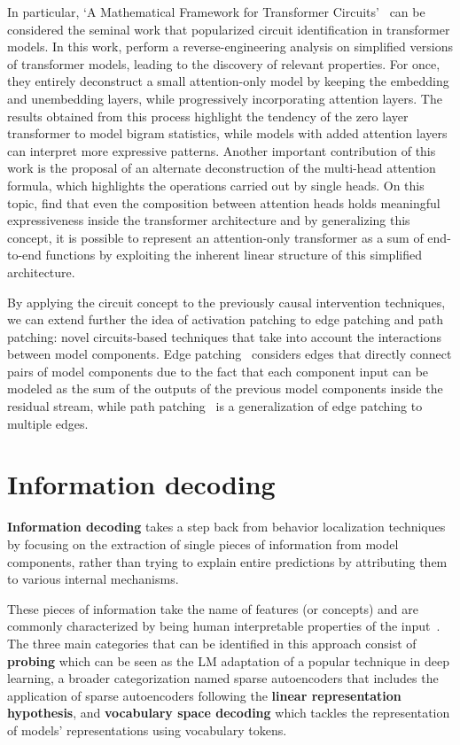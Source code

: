 In particular, `A Mathematical Framework for Transformer Circuits'~\cite{elhage2021} can be considered the seminal work that popularized circuit identification in transformer models.
In this work, \citet{elhage2021} perform a reverse-engineering analysis on simplified versions of transformer models, leading to the discovery of relevant properties.
For once, they entirely deconstruct a small attention-only model by keeping the embedding and unembedding layers, while progressively incorporating attention layers.
The results obtained from this process highlight the tendency of the zero layer transformer to model bigram statistics, while models with added attention layers can interpret more expressive patterns.
Another important contribution of this work is the proposal of an alternate deconstruction of the multi-head attention formula, which highlights the operations carried out by single heads.
On this topic, \citet{elhage2021} find that even the composition between attention heads holds meaningful expressiveness inside the transformer architecture and by generalizing this concept, it is possible to represent an attention-only transformer as a sum of end-to-end functions by exploiting the inherent linear structure of this simplified architecture.

By applying the circuit concept to the previously causal intervention techniques, we can extend further the idea of activation patching to edge patching and path patching: novel circuits-based techniques that take into account the interactions between model components.
Edge patching~\cite{li2023} considers edges that directly connect pairs of model components due to the fact that each component input can be modeled as the sum of the outputs of the previous model components inside the residual stream, while path patching~\cite{wang2023} is a generalization of edge patching to multiple edges.

\section{Information decoding}

\textbf{Information decoding} takes a step back from behavior localization techniques by focusing on the extraction of single pieces of information from model components, rather than trying to explain entire predictions by attributing them to various internal mechanisms.

These pieces of information take the name of features (or concepts) and are commonly characterized by being human interpretable properties of the input~\cite{kim2018}.
The three main categories that can be identified in this approach consist of \textbf{probing} which can be seen as the LM adaptation of a popular technique in deep learning, a broader categorization named sparse autoencoders that includes the application of sparse autoencoders following the \textbf{linear representation hypothesis}, and \textbf{vocabulary space decoding} which tackles the representation of models' representations using vocabulary tokens.

